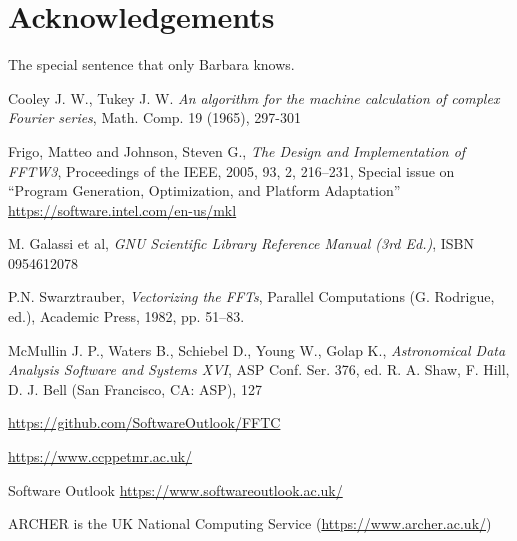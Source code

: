 \documentclass[12pt, a4paper]{article}
\begin{document}
\section{Acknowledgements}
The special sentence that only Barbara knows.
\begin{thebibliography}{9}

Cooley J. W., Tukey J. W.
{\it An algorithm for the machine calculation of complex Fourier series},
Math. Comp. 19 (1965), 297-301
 
Frigo, Matteo and Johnson, Steven G.,
{\it The Design and Implementation of FFTW3},
Proceedings of the IEEE,
2005,
93,
2,
216--231,
Special issue on ``Program Generation, Optimization, and Platform Adaptation''
\url{https://software.intel.com/en-us/mkl}

M. Galassi et al, {\it GNU Scientific Library Reference Manual (3rd Ed.)}, ISBN 0954612078
  
P.N. Swarztrauber, {\it Vectorizing the FFTs}, Parallel Computations (G. Rodrigue, ed.), Academic Press, 1982, pp. 51--83.
  
McMullin J. P., Waters B., Schiebel D., Young W., Golap K.,
{\it Astronomical Data Analysis Software and Systems XVI},
ASP Conf. Ser. 376, ed. R. A. Shaw, F. Hill, D. J. Bell (San Francisco, CA: ASP), 127

\url{https://github.com/SoftwareOutlook/FFTC}
    
\url{https://www.ccppetmr.ac.uk/}

Software Outlook \url{https://www.softwareoutlook.ac.uk/}

ARCHER is the UK National Computing Service (\url{https://www.archer.ac.uk/})
  
\end{thebibliography}
\end{document}
